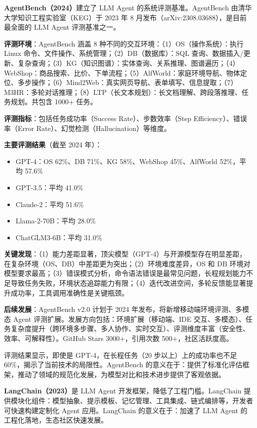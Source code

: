 \documentclass[12pt,a4paper]{article}
\begin{document}
\textbf{AgentBench（2024）}建立了 LLM Agent 的系统评测基准。AgentBench 由清华大学知识工程实验室（KEG）于 2023 年 8 月发布（arXiv:2308.03688），是目前最全面的 LLM Agent 评测基准之一。

\textbf{评测环境}：AgentBench 涵盖 8 种不同的交互环境：（1）OS（操作系统）：执行 Linux 命令、文件操作、系统管理；（2）DB（数据库）：SQL 查询、数据插入/更新、复杂查询；（3）KG（知识图谱）：实体查询、关系推理、图谱遍历；（4）WebShop：商品搜索、比价、下单流程；（5）AlfWorld：家庭环境导航、物体定位、多步操作；（6）Mind2Web：真实网页导航、表单填写、信息提取；（7）M3HR：多轮对话推理；（8）LTP（长文本规划）：长文档理解、跨段落推理、任务规划。共包含 1000+ 任务。

\textbf{评测指标}：包括任务成功率（Success Rate）、步数效率（Step Efficiency）、错误率（Error Rate）、幻觉检测（Hallucination）等维度。

\textbf{主要评测结果}（截至 2024 年）：
\begin{itemize}
    \item GPT-4：OS 62\%、DB 71\%、KG 58\%、WebShop 45\%、AlfWorld 52\%，平均 57.6\%
    \item GPT-3.5：平均 41.0\%
    \item Claude-2：平均 51.6\%
    \item Llama-2-70B：平均 28.0\%
    \item ChatGLM3-6B：平均 31.0\%
\end{itemize}

\textbf{关键发现}：（1）能力差距显著，顶尖模型（GPT-4）与开源模型存在明显差距，在复杂环境（OS、DB）中差距更为突出；（2）环境难度差异，OS 和 DB 环境对模型要求最高；（3）错误模式分析，命令语法错误是最常见问题，长程规划能力不足导致任务失败，环境状态追踪能力有限；（4）迭代改进空间，多轮反馈能显著提升成功率，工具调用准确性是关键瓶颈。

\textbf{后续发展}：AgentBench v2.0 计划于 2024 年发布，将新增移动端环境评测、多模态 Agent 评测扩展。发展方向包括：环境扩展（移动端、IDE 交互、多模态）、任务复杂度提升（跨环境多步骤、多人协作、实时交互）、评测维度丰富（安全性、效率、可解释性）。GitHub Stars 3000+，引用次数 500+，社区活跃度高。

评测结果显示，即使是 GPT-4，在长程任务（20 步以上）上的成功率也不足 60\%，揭示了当前技术的局限性。AgentBench 的意义在于：提供了标准化评估框架，推动了领域的规范化发展，为模型对比和技术进步提供了客观依据。

\textbf{LangChain（2023）}是 LLM Agent 开发框架，降低了工程门槛。LangChain 提供模块化组件：模型抽象、提示模板、记忆管理、工具集成、链式编排等，开发者可快速构建定制化 Agent 应用。LangChain 的意义在于：加速了 LLM Agent 的工程化落地，生态社区快速发展。
\end{document}
